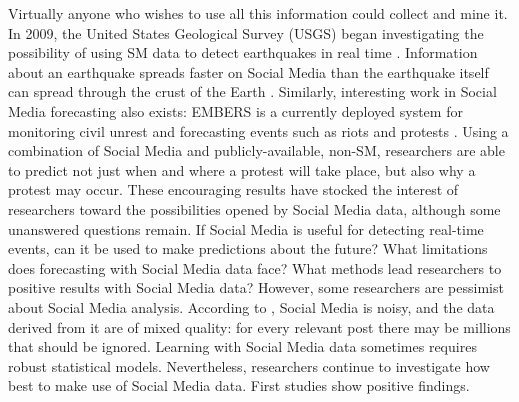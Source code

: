 \documentclass[b5paper,]{book}
\theoremstyle{definition}
\theoremstyle{definition}
\theoremstyle{definition}
\theoremstyle{remark}
\begin{document}
Virtually anyone who wishes to use all this information could collect
and mine it. In 2009, the United States Geological Survey (USGS) began
investigating the possibility of using SM data to detect earthquakes in
real time \citep{ellis2015usgs}. Information about an earthquake spreads
faster on Social Media than the earthquake itself can spread through the
crust of the Earth \citep{konkel2013tweets}. Similarly, interesting work
in Social Media forecasting also exists: EMBERS is a currently deployed
system for monitoring civil unrest and forecasting events such as riots
and protests \citep{ramakrishnan2014beating}. Using a combination of
Social Media and publicly-available, non-SM, researchers are able to
predict not just when and where a protest will take place, but also why
a protest may occur. These encouraging results have stocked the interest
of researchers toward the possibilities opened by Social Media data,
although some unanswered questions remain. If Social Media is useful for
detecting real-time events, can it be used to make predictions about the
future? What limitations does forecasting with Social Media data face?
What methods lead researchers to positive results with Social Media
data? However, some researchers are pessimist about Social Media
analysis. According to \citep{ruths2014social, weller2015accepting},
Social Media is noisy, and the data derived from it are of mixed
quality: for every relevant post there may be millions that should be
ignored. Learning with Social Media data sometimes requires robust
statistical models. Nevertheless, researchers continue to investigate
how best to make use of Social Media data. First studies show positive
findings.
\end{document}
